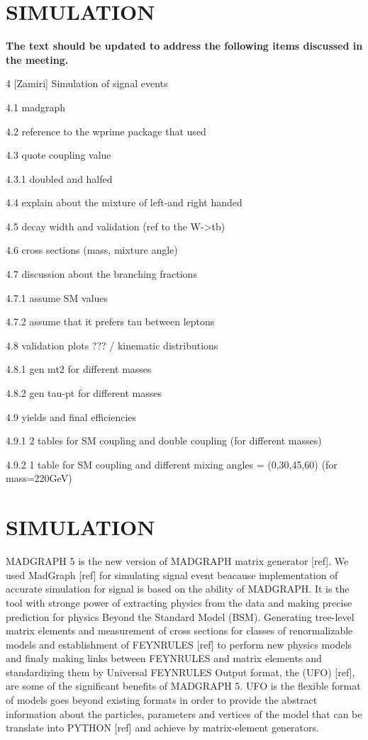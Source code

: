 \section{SIMULATION}\label{sec:evo}

{\bf The text should be updated to address the following items discussed in the meeting.}

4 [Zamiri] Simulation of signal events

4.1 madgraph

4.2 reference to the wprime package that used

4.3 quote coupling value

4.3.1 doubled and halfed

4.4 explain about the mixture of left-and right handed

4.5 decay width and validation (ref to the W->tb)

4.6 cross sections (mass, mixture angle)

4.7 discussion about the branching fractions

4.7.1 assume SM values

4.7.2 assume that it prefers tau between leptons

4.8 validation plots ??? / kinematic distributions

4.8.1 gen mt2 for different masses

4.8.2 gen tau-pt for different masses

4.9 yields and final efficiencies

4.9.1 2 tables for SM coupling and double coupling (for different masses)

4.9.2 1 table for SM coupling and different mixing angles = (0,30,45,60) (for mass=220GeV)

\section{SIMULATION}\label{sec:evo}
  {\small MADGRAPH 5} is the new version of {\small MADGRAPH} matrix generator [ref]. We used MadGraph [ref] for simulating signal event beacause implementation of accurate simulation for signal is based on the ability of {\small MADGRAPH}. It is the tool with stronge power of extracting physics from the data and making precise prediction for physics Beyond the Standard Model {\small (BSM)}. Generating tree-level matrix elements and measurement of cross sections for classes of renormalizable models and establishment of {\small FEYNRULES} [ref] to perform new physics models and finaly making links between {\small FEYNRULES} and matrix elements and standardizing them by Universal F{\small EYNRULES} Output format, the {\small (UFO)} [ref], are some of the significant benefits of {\small MADGRAPH 5}. {\small UFO} is the flexible format of models goes beyond existing formats in order to provide the abstract information about the particles, parameters and vertices of the model that can be translate into {\small PYTHON} [ref] and achieve by matrix-element generators. 
 

